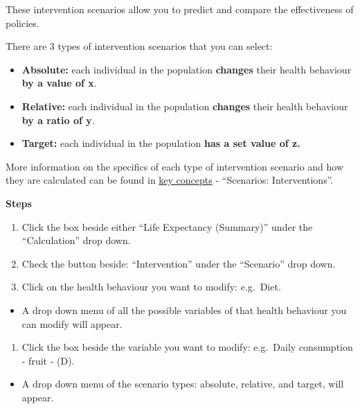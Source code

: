 \documentclass[]{book}
\providecommand{\tightlist}{%
  \setlength{\itemsep}{0pt}\setlength{\parskip}{0pt}}
\begin{document}
These intervention scenarios allow you to predict and compare the
effectiveness of policies.

There are 3 types of intervention scenarios that you can select:

\begin{itemize}
\tightlist
\item
  \textbf{Absolute:} each individual in the population \textbf{changes}
  their health behaviour \textbf{by a value of x}.
\item
  \textbf{Relative:} each individual in the population \textbf{changes}
  their health behaviour \textbf{by a ratio of y}.
\item
  \textbf{Target:} each individual in the population \textbf{has a set
  value of z.}
\end{itemize}

More information on the specifics of each type of intervention scenario
and how they are calculated can be found in
\protect\hyperlink{keyconcepts}{key concepts} - ``Scenarios:
Interventions''.

\textbf{Steps}

\begin{enumerate}
\def\labelenumi{\arabic{enumi}.}
\item
  Click the box beside either ``Life Expectancy (Summary)'' under the
  ``Calculation'' drop down.
\item
  Check the button beside: ``Intervention'' under the ``Scenario'' drop
  down.
\item
  Click on the health behaviour you want to modify: e.g.~Diet.
\end{enumerate}

\begin{itemize}
\tightlist
\item
  A drop down menu of all the possible variables of that health
  behaviour you can modify will appear.
\end{itemize}

\begin{enumerate}
\def\labelenumi{\arabic{enumi}.}
\setcounter{enumi}{3}
\tightlist
\item
  Click the box beside the variable you want to modify: e.g.~Daily
  consumption - fruit - (D).
\end{enumerate}

\begin{itemize}
\tightlist
\item
  A drop down menu of the scenario types: absolute, relative, and
  target, will appear.
\end{itemize}
\end{document}

